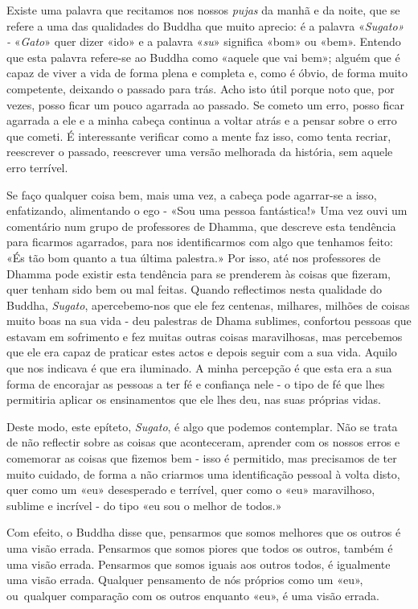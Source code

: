 Existe uma palavra que recitamos nos nossos \emph{pujas} da manhã e da
noite, que se refere a uma das qualidades do Buddha que muito aprecio: é
a palavra «\emph{Sugato» -} «\emph{Gato}» quer dizer «ido» e a palavra
«\emph{su}» significa «bom» ou «bem». Entendo que esta palavra refere-se
ao Buddha como «aquele que vai bem»; alguém que é capaz de viver a vida
de forma plena e completa e, como é óbvio, de forma muito competente,
deixando o passado para trás. Acho isto útil porque noto que, por vezes,
posso ficar um pouco agarrada ao passado. Se cometo um erro, posso ficar
agarrada a ele e a minha cabeça continua a voltar atrás e a pensar sobre
o erro que cometi. É interessante verificar como a mente faz isso, como
tenta recriar, reescrever o passado, reescrever uma versão melhorada da
história, sem aquele erro terrível.

Se faço qualquer coisa bem, mais uma vez, a cabeça pode agarrar-se a
isso, enfatizando, alimentando o ego - «Sou uma pessoa fantástica!» Uma
vez ouvi um comentário num grupo de professores de Dhamma, que descreve
esta tendência para ficarmos agarrados, para nos identificarmos com algo
que tenhamos feito: «És tão bom quanto a tua última palestra.» Por isso,
até nos professores de Dhamma pode existir esta tendência para se
prenderem às coisas que fizeram, quer tenham sido bem ou mal feitas.
Quando reflectimos nesta qualidade do Buddha, \emph{Sugato},
apercebemo-nos que ele fez centenas, milhares, milhões de coisas muito
boas na sua vida - deu palestras de Dhama sublimes, confortou pessoas
que estavam em sofrimento e fez muitas outras coisas maravilhosas, mas
percebemos que ele era capaz de praticar estes actos e depois seguir com
a sua vida. Aquilo que nos indicava é que era iluminado. A minha
percepção é que esta era a sua forma de encorajar as pessoas a ter fé e
confiança nele - o tipo de fé que lhes permitiria aplicar os
ensinamentos que ele lhes deu, nas suas próprias vidas.

Deste modo, este epíteto, \emph{Sugato}, é algo que podemos contemplar.
Não se trata de não reflectir sobre as coisas que aconteceram, aprender
com os nossos erros e comemorar as coisas que fizemos bem - isso é
permitido, mas precisamos de ter muito cuidado, de forma a não criarmos
uma identificação pessoal à volta disto, quer como um «eu» desesperado e
terrível, quer como o «eu» maravilhoso, sublime e incrível - do tipo «eu
sou o melhor de todos.»

Com efeito, o Buddha disse que, pensarmos que somos melhores que os
outros é uma visão errada. Pensarmos que somos piores que todos os
outros, também é uma visão errada. Pensarmos que somos iguais aos outros
todos, é igualmente uma visão errada. Qualquer pensamento de nós
próprios como um «eu», ou~qualquer comparação com os outros enquanto
«eu», é uma visão errada.

